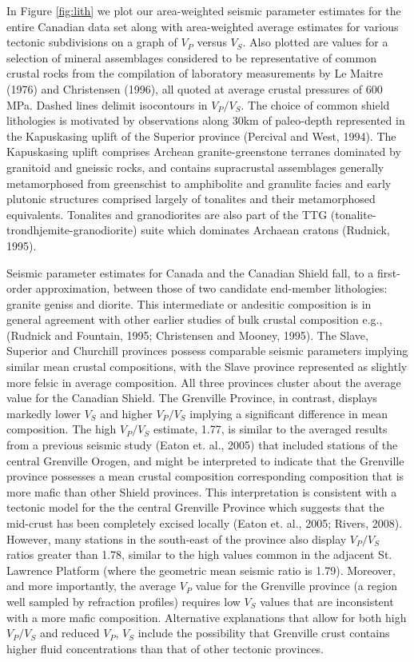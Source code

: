 \documentclass[review]{elsarticle}
\begin{document}
In Figure \ref{fig:lith} we plot our area-weighted seismic parameter estimates for the entire Canadian data set along with area-weighted average estimates for various tectonic subdivisions on a graph of $V_P$ versus $V_S$. Also plotted are values for a selection of mineral assemblages considered to be representative of common crustal rocks from the compilation of laboratory measurements by Le Maitre (1976) and Christensen (1996), all quoted at average crustal pressures of 600 MPa. Dashed lines delimit isocontours in $V_P/V_S$. The choice of common shield lithologies is motivated by observations along 30km of paleo-depth represented in the Kapuskasing uplift of the Superior province (Percival and West, 1994). The Kapuskasing uplift comprises Archean granite-greenstone terranes dominated by granitoid and gneissic rocks, and contains supracrustal assemblages generally metamorphosed from greenschist to amphibolite and granulite facies and early plutonic structures comprised largely of tonalites and their metamorphosed equivalents. Tonalites and granodiorites are also part of the TTG (tonalite-trondhjemite-granodiorite) suite which dominates Archaean cratons (Rudnick, 1995).

Seismic parameter estimates for Canada and the Canadian Shield fall, to a first-order approximation, between those of two candidate end-member lithologies: granite geniss and diorite. This intermediate or andesitic composition is in general agreement with other earlier studies of bulk crustal composition e.g., (Rudnick and Fountain, 1995; Christensen and Mooney, 1995). The Slave, Superior and Churchill provinces possess comparable seismic parameters implying similar mean crustal compositions, with the Slave province represented as slightly more felsic in average composition. All three provinces cluster about the average value for the Canadian Shield. The Grenville Province, in contrast, displays markedly lower $V_S$ and higher $V_P/V_S$ implying a significant difference in mean composition. The high $V_P/V_S$ estimate, 1.77, is similar to the averaged results from a previous seismic study (Eaton et. al., 2005) that included stations of the central Grenville Orogen, and might be interpreted to indicate that the Grenville province possesses a mean crustal composition corresponding composition that is more mafic than other Shield provinces. This interpretation is consistent with a tectonic model for the the central Grenville Province which suggests that the mid-crust has been completely excised locally (Eaton et. al., 2005; Rivers, 2008). However, many stations in the south-east of the province also display $V_P/V_S$ ratios greater than 1.78, similar to the high values common in the adjacent St. Lawrence Platform (where the geometric mean seismic ratio is 1.79). Moreover, and more importantly, the average $V_P$ value for the Grenville province (a region well sampled by refraction profiles) requires low $V_S$ values that are inconsistent with a more mafic composition. Alternative explanations that allow for both high $V_P/V_S$ and reduced $V_P$, $V_S$ include the possibility that Grenville crust contains higher fluid concentrations than that of other tectonic provinces.
\end{document}
